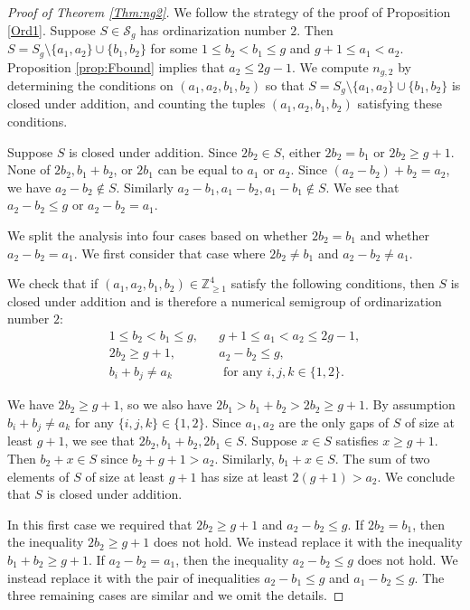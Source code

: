 \documentclass[12pt]{amsart}
\newcommand{\Z}{{\mathbb Z}}
\newcommand{\Sg}{{\mathcal S}}
\theoremstyle{plain}\newtheorem{proposition}{Proposition}[section]
\begin{document}
\begin{proof}[Proof of Theorem \ref{Thm:ng2}]
We follow the strategy of the proof of Proposition \ref{Ord1}.  Suppose $S \in \Sg_g$ has ordinarization number $2$.  Then $S = S_g \setminus \{a_1, a_2\} \cup \{b_1, b_2\}$ for some $1\le b_2 < b_1 \le g$ and $g+1 \le a_1 < a_2$.   Proposition \ref{prop:Fbound} implies that $a_2 \le 2g-1$.  We compute $n_{g,2}$ by determining the conditions on $(a_1,a_2,b_1,b_2)$ so that $S = S_g \setminus \{a_1, a_2\} \cup \{b_1, b_2\}$ is closed under addition, and counting the tuples $(a_1,a_2,b_1,b_2)$ satisfying these conditions.

Suppose $S$ is closed under addition.  Since $2b_2 \in S$, either $2b_2 = b_1$ or $2b_2 \ge g+1$.  None of $2b_2, b_1+b_2$, or $2b_1$ can be equal to $a_1$ or $a_2$.  Since $(a_2 - b_2) + b_2  = a_2$, we have $a_2 -b_2 \not\in S$.  Similarly $a_2-b_1, a_1-b_2, a_1-b_1 \not\in S$.  We see that $a_2 - b_2 \le g$ or $a_2 - b_2 = a_1$.  

We split the analysis into four cases based on whether $2b_2 = b_1$ and whether $a_2 - b_2 = a_1$.  We first consider that case where $2b_2 \neq b_1$ and $a_2-b_2 \neq a_1$.  

We check that if $(a_1,a_2,b_1,b_2) \in \Z_{\ge 1}^4$ satisfy the following conditions, then $S$ is closed under addition and is therefore a numerical semigroup of ordinarization number $2$:
\begin{eqnarray*}
1 \le b_2 < b_1 \le g, &  & g+1 \le a_1 < a_2 \le 2g-1, \\
2b_2 \ge g+1, \ & & 
a_2 - b_2 \le g, \\
b_i + b_j \neq a_k & & \text{ for any } i,j,k \in \{1,2\}.
\end{eqnarray*}

We have $2b_2 \ge g+1$, so we also have $2b_1 > b_1+b_2 > 2b_2 \ge g+1$.  By assumption $b_i+b_j \neq a_k$ for any $\{i,j,k\} \in \{1,2\}$. Since $a_1, a_2$ are the only gaps of $S$ of size at least $g+1$, we see that $2b_2, b_1 + b_2, 2b_1 \in S$.  Suppose $x \in S$ satisfies $x \ge g+1$.  Then $b_2 + x \in S$ since $b_2 + g+1 > a_2$.  Similarly, $b_1 + x \in S$.  The sum of two elements of $S$ of size at least $g+1$ has size at least $2(g+1)> a_2$.  We conclude that $S$ is closed under addition.  

In this first case we required that $2b_2 \ge g+1$ and $a_2 - b_2 \le g$.  If $2b_2 = b_1$, then the inequality $2b_2 \ge g+1$ does not hold.  We instead replace it with the inequality $b_1 + b_2 \ge g+1$.  If $a_2 - b_2 = a_1$, then the inequality $a_2 - b_2 \le g$ does not hold.  We instead replace it with the pair of inequalities $a_2 - b_1 \le g$ and $a_1 - b_2 \le g$.  The three remaining cases are similar and we omit the details.


\end{proof}
\end{document}
